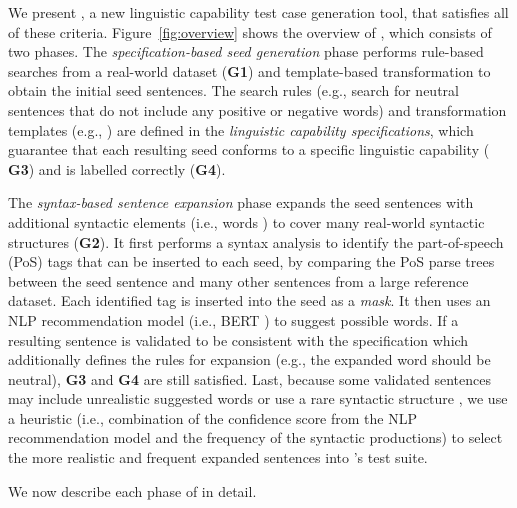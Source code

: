 We present \tool{}, a new linguistic capability test case generation
tool, that satisfies all of these criteria.  
Figure~\ref{fig:overview} shows the overview of \tool{}, which
consists of two phases.  The \emph{specification-based seed
  generation} phase performs rule-based searches from a real-world
dataset ({\bf G1}) and template-based transformation to obtain the
initial seed sentences.  The search rules (e.g., search for neutral
sentences that do not include any positive or negative words) and
transformation templates (e.g., ) are defined in
the \emph{linguistic capability specifications}, which guarantee that
each resulting seed conforms to a specific linguistic capability ({\bf
  G3}) and is labelled correctly ({\bf G4}).

The \emph{syntax-based sentence expansion} phase expands the seed
sentences with additional syntactic elements (i.e., words )
to cover many real-world syntactic structures ({\bf G2}). It first
performs a syntax analysis to identify the part-of-speech (PoS) tags
that can be inserted to each seed, by comparing the PoS parse trees
between the seed sentence and many other sentences from a large
reference dataset. Each identified tag is inserted into the seed as a
\emph{mask}. It then uses an NLP recommendation model (i.e., BERT
\cite{}) to suggest possible words. If a resulting sentence is
validated to be consistent with the specification which additionally
defines the rules for expansion (e.g., the expanded word should be
neutral), {\bf G3} and {\bf G4} are still satisfied.  Last, because
some validated sentences may include unrealistic suggested words or
use a rare syntactic structure , we use a heuristic (i.e., combination of the confidence
score from the NLP recommendation model and the frequency of the
syntactic productions) to select the more realistic and frequent
expanded sentences into \tool{}'s test suite.

We now describe each phase of \tool{} in detail.


